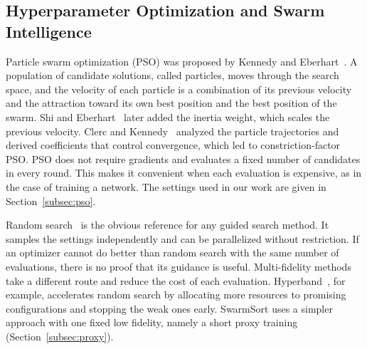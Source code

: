\subsection{Hyperparameter Optimization and Swarm Intelligence}
\label{subsec:rw-hpo}

Particle swarm optimization (PSO) was proposed by Kennedy and Eberhart~\cite{kennedy1995particle}. A population of candidate solutions, called particles, moves through the search space, and the velocity of each particle is a combination of its previous velocity and the attraction toward its own best position and the best position of the swarm. Shi and Eberhart~\cite{shi1998modified} later added the inertia weight, which scales the previous velocity. Clerc and Kennedy~\cite{clerc2002particle} analyzed the particle trajectories and derived coefficients that control convergence, which led to constriction-factor PSO. PSO does not require gradients and evaluates a fixed number of candidates in every round. This makes it convenient when each evaluation is expensive, as in the case of training a network. The settings used in our work are given in Section~\ref{subsec:pso}.

Random search~\cite{bergstra2012random} is the obvious reference for any guided search method. It samples the settings independently and can be parallelized without restriction. If an optimizer cannot do better than random search with the same number of evaluations, there is no proof that its guidance is useful. Multi-fidelity methods take a different route and reduce the cost of each evaluation. Hyperband~\cite{li2018hyperband}, for example, accelerates random search by allocating more resources to promising configurations and stopping the weak ones early. SwarmSort uses a simpler approach with one fixed low fidelity, namely a short proxy training (Section~\ref{subsec:proxy}).

